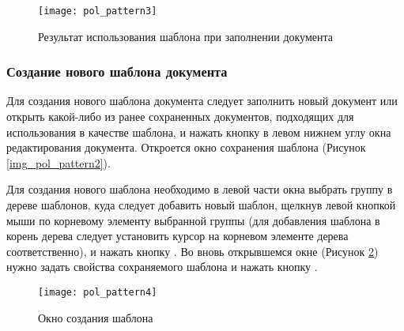  \begin{figure}[h!]\centering
   \texttt{[image: pol\_pattern3]}
   \caption{Результат использования шаблона при заполнении документа}
   \label{img_pol_pattern3}
 \end{figure}
 
\subsubsection{Создание нового шаблона документа} 

Для создания нового шаблона документа следует заполнить новый документ или открыть какой-либо из ранее сохраненных документов, подходящих для использования в качестве шаблона, и нажать кнопку  в левом нижнем углу окна редактирования документа. Откроется окно сохранения шаблона (Рисунок \ref{img_pol_pattern2}).

Для создания нового шаблона необходимо в левой части окна выбрать группу в дереве шаблонов, куда следует добавить новый шаблон, щелкнув левой кнопкой мыши по корневому элементу выбранной группы (для добавления шаблона в корень дерева следует установить курсор на корневом элементе дерева соответственно), и нажать кнопку . Во вновь открывшемся окне (Рисунок \ref{img_pol_pattern4}) нужно задать свойства сохраняемого шаблона и нажать кнопку . 

 \begin{figure}[h!]\centering
   \texttt{[image: pol\_pattern4]}
   \caption{Окно создания шаблона}
   \label{img_pol_pattern4}
 \end{figure}
 
